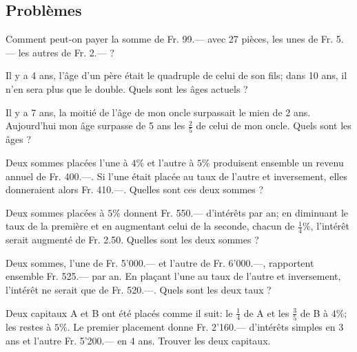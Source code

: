 \subsection{Problèmes}

\begin{exercice}
Comment peut-on payer la somme de Fr. 99.— avec 27 pièces, les unes de Fr. 5.— les autres de Fr. 2.— ?
\end{exercice}

\begin{exercice}
Il y a 4 ans, l’âge d’un père était le quadruple de celui de son fils; dans 10 ans, il n’en sera plus que le double. Quels sont les âges actuels ?
\end{exercice}

\begin{exercice}
Il y a 7 ans, la moitié de l’âge de mon oncle surpassait le mien de 2 ans. Aujourd’hui mon âge surpasse de 5 ans les $\frac{2}{5}$ de celui de mon oncle. Quels sont les âges ?
\end{exercice}

\begin{exercice}
Deux sommes placées l’une à $4 \%$ et l’autre à $5 \%$ produisent ensemble un revenu annuel de Fr. 400.—. Si l’une était placée au taux de l’autre et inversement, elles donneraient alors Fr. 410.—. Quelles sont ces deux sommes ?
\end{exercice}

\begin{exercice}
Deux sommes placées à $5 \%$ donnent Fr. 550.— d’intérêts par an; en diminuant le taux de la première et en augmentant celui de la seconde, chacun de $\frac{1}{4} \%$, l’intérêt serait augmenté de Fr. 2.50. Quelles sont les deux sommes ?
\end{exercice}

\begin{exercice}
Deux sommes, l’une de Fr. 5’000.— et l’autre de Fr. 6’000.—, rapportent ensemble Fr. 525.— par an. En plaçant l’une au taux de l’autre et inversement, l’intérêt ne serait que de Fr. 520.—. Quels sont les deux taux ?
\end{exercice}

\begin{exercice}
Deux capitaux A et B ont été placés comme il suit: le $\frac{1}{4}$ de A et les $\frac{3}{5}$ de B à $4 \%$; les restes à $5  \%$. Le premier placement donne Fr. 2’160.— d’intérêts simples en 3 ans et l’autre Fr. 5’200.— en 4 ans. Trouver les deux capitaux.
\end{exercice}

